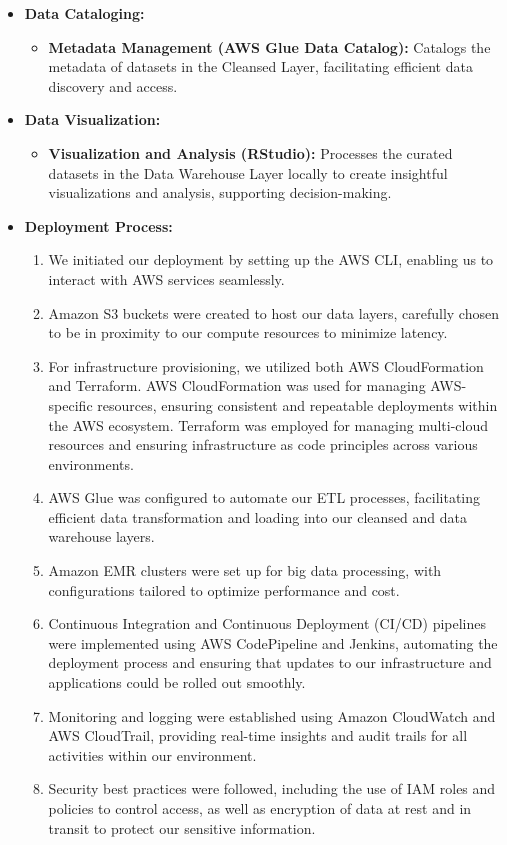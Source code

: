 \documentclass{article}
\begin{document}
\begin{itemize}
    \item \textbf{Data Cataloging:} 
        \begin{itemize}
            \item \textbf{Metadata Management (AWS Glue Data Catalog):} Catalogs the metadata of datasets in the Cleansed Layer, facilitating efficient data discovery and access.
        \end{itemize}
    
    \item \textbf{Data Visualization:} 
        \begin{itemize}
            \item \textbf{Visualization and Analysis (RStudio):} Processes the curated datasets in the Data Warehouse Layer locally to create insightful visualizations and analysis, supporting decision-making.
        \end{itemize}
    
    \item \textbf{Deployment Process:}
        \begin{enumerate}
            \item We initiated our deployment by setting up the AWS CLI, enabling us to interact with AWS services seamlessly.
            \item Amazon S3 buckets were created to host our data layers, carefully chosen to be in proximity to our compute resources to minimize latency.
            \item For infrastructure provisioning, we utilized both AWS CloudFormation and Terraform. AWS CloudFormation was used for managing AWS-specific resources, ensuring consistent and repeatable deployments within the AWS ecosystem. Terraform was employed for managing multi-cloud resources and ensuring infrastructure as code principles across various environments.
            \item AWS Glue was configured to automate our ETL processes, facilitating efficient data transformation and loading into our cleansed and data warehouse layers.
            \item Amazon EMR clusters were set up for big data processing, with configurations tailored to optimize performance and cost.
            \item Continuous Integration and Continuous Deployment (CI/CD) pipelines were implemented using AWS CodePipeline and Jenkins, automating the deployment process and ensuring that updates to our infrastructure and applications could be rolled out smoothly.
            \item Monitoring and logging were established using Amazon CloudWatch and AWS CloudTrail, providing real-time insights and audit trails for all activities within our environment.
            \item Security best practices were followed, including the use of IAM roles and policies to control access, as well as encryption of data at rest and in transit to protect our sensitive information.
        \end{enumerate}
    
\end{itemize}
\end{document}
